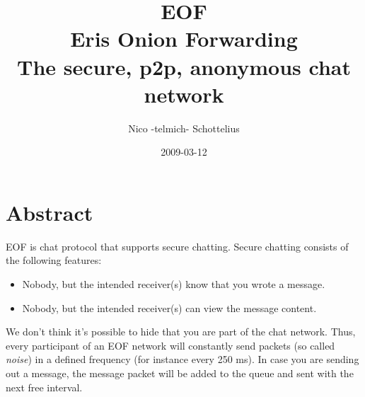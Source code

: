 \documentclass[12pt,a4paper]{article}
\begin{document}
\title{EOF\\Eris Onion Forwarding\\The secure, p2p, anonymous chat network}
\date{2009-03-12}
\author{Nico -telmich- Schottelius}

\maketitle
\tableofcontents
\newpage

\section{Abstract}
EOF is chat protocol that supports secure chatting.
Secure chatting consists of the following features:
\begin{itemize}
\item Nobody, but the intended receiver(s) know that you wrote a message.
\item Nobody, but the intended receiver(s) can view the message content.
\end{itemize}
We don't think it's possible to hide that you are part of the chat network.
Thus, every participant of an EOF network will constantly send packets
(so called \emph{noise}) in a defined frequency (for instance every 250 ms).
In case you are sending out a message, the message packet will be added to the
queue and sent with the next free interval.

\end{document}
